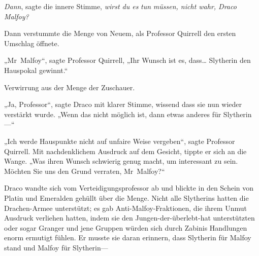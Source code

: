 \emph{Dann}, sagte die innere Stimme, \emph{wirst du es} \emph{tun} \emph{müssen, nicht wahr, Draco Malfoy?}

Dann verstummte die Menge von Neuem, als Professor Quirrell den ersten Umschlag öffnete.

„Mr~Malfoy“, sagte Professor Quirrell, „Ihr Wunsch ist es, dass… Slytherin den Hauspokal gewinnt.“

Verwirrung aus der Menge der Zuschauer.

„Ja, Professor“, sagte Draco mit klarer Stimme, wissend dass sie nun wieder verstärkt wurde. „Wenn das nicht möglich ist, dann etwas anderes für Slytherin—“

„Ich werde Hauspunkte nicht auf unfaire Weise vergeben“, sagte Professor Quirrell. Mit nachdenklichem Ausdruck auf dem Gesicht, tippte er sich an die Wange. „Was ihren Wunsch schwierig genug macht, um interessant zu sein. Möchten Sie uns den Grund verraten, Mr~Malfoy?“

Draco wandte sich vom Verteidigungsprofessor ab und blickte in den Schein von Platin und Emeralden gehüllt über die Menge. Nicht alle Slytherins hatten die Drachen-Armee unterstützt; es gab Anti-Malfoy-Fraktionen, die ihrem Unmut Ausdruck verliehen hatten, indem sie den Jungen-der-überlebt-hat unterstützten oder sogar Granger und jene Gruppen würden sich durch Zabinis Handlungen enorm ermutigt fühlen. Er musste sie daran erinnern, dass Slytherin für Malfoy stand und Malfoy für Slytherin—


